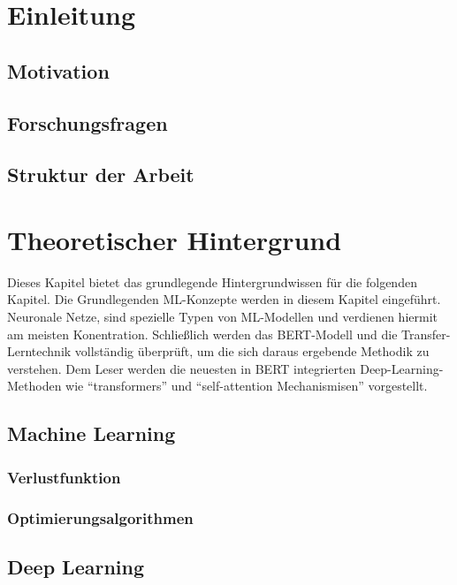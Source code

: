 \documentclass[
        ngerman,
        paper=a4,
        numbers=noendperiod,
]{scrreprt}
\begin{document}
\chapter{Einleitung}
\section{Motivation}
\section{Forschungsfragen}
\section{Struktur der Arbeit}

\chapter{Theoretischer Hintergrund}
Dieses Kapitel bietet das grundlegende Hintergrundwissen für die folgenden Kapitel. Die Grundlegenden ML-Konzepte werden in diesem Kapitel eingeführt. Neuronale Netze, sind spezielle Typen von ML-Modellen und verdienen hiermit am meisten Konentration. Schließlich werden das BERT-Modell und die Transfer-Lerntechnik vollständig überprüft, um die sich daraus ergebende Methodik zu verstehen. Dem Leser werden die neuesten in BERT integrierten Deep-Learning-Methoden wie \enquote{transformers} und \enquote{self-attention Mechanismisen} vorgestellt.

\section{Machine Learning}
\subsection{Verlustfunktion}
\subsection{Optimierungsalgorithmen}
\section{Deep Learning}
\end{document}

